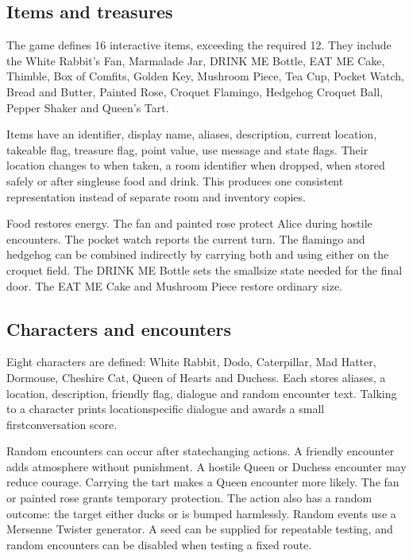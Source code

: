 \documentclass[letterpaper,10pt,english]{sphinxmanual}
\begin{document}
\subsection{Items and treasures}
\label{\detokenize{AssignmentFour/main:items-and-treasures}}
\sphinxAtStartPar
The game defines 16 interactive items, exceeding the required 12.
They include the White Rabbit’s Fan, Marmalade Jar, DRINK ME Bottle, EAT ME
Cake, Thimble, Box of Comfits, Golden Key, Mushroom Piece, Tea Cup, Pocket
Watch, Bread and Butter, Painted Rose, Croquet Flamingo, Hedgehog Croquet Ball,
Pepper Shaker and Queen’s Tart.

\sphinxAtStartPar
Items have an identifier, display name, aliases, description, current location,
takeable flag, treasure flag, point value, use message and state flags. Their
location changes to  when taken, a room identifier when dropped,
 when stored safely or  after single\sphinxhyphen{}use food and drink.
This produces one consistent representation instead of separate room and
inventory copies.

\sphinxAtStartPar
Food restores energy. The fan and painted rose protect Alice during hostile
encounters. The pocket watch reports the current turn. The flamingo and
hedgehog can be combined indirectly by carrying both and using either on the
croquet field. The DRINK ME Bottle sets the small\sphinxhyphen{}size state needed for the
final door. The EAT ME Cake and Mushroom Piece restore ordinary size.


\subsection{Characters and encounters}
\label{\detokenize{AssignmentFour/main:characters-and-encounters}}
\sphinxAtStartPar
Eight characters are defined: White Rabbit, Dodo, Caterpillar, Mad Hatter,
Dormouse, Cheshire Cat, Queen of Hearts and Duchess. Each stores aliases, a
location, description, friendly flag, dialogue and random encounter text.
Talking to a character prints location\sphinxhyphen{}specific dialogue and awards a small
first\sphinxhyphen{}conversation score.

\sphinxAtStartPar
Random encounters can occur after state\sphinxhyphen{}changing actions. A friendly encounter
adds atmosphere without punishment. A hostile Queen or Duchess encounter may
reduce courage. Carrying the tart makes a Queen encounter more likely. The fan
or painted rose grants temporary protection. The  action also has a
random outcome: the target either ducks or is bumped harmlessly. Random events
use a Mersenne Twister generator. A seed can be supplied for repeatable testing,
and random encounters can be disabled when testing a fixed route.
\end{document}
